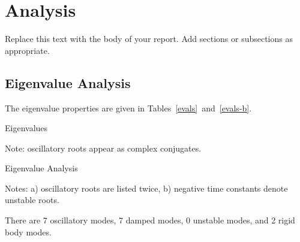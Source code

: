\chapter{Analysis}
Replace this text with the body of your report.  Add sections or subsections as appropriate.
\section{Eigenvalue Analysis}
The eigenvalue properties are given in Tables~\ref{evals}~and~\ref{evals-b}.

\begin{table}[ht]
\begin{center}
\begin{threeparttable}
\begin{footnotesize}
\caption{Eigenvalues}
\label{evals}
\begin{tablenotes}
\item Note: oscillatory roots appear as complex conjugates.
\end{tablenotes}
\end{footnotesize}
\end{threeparttable}
\end{center}
\end{table}
\begin{table}[ht]
\begin{center}
\begin{threeparttable}
\begin{footnotesize}
\caption{Eigenvalue Analysis}
\label{evals-b}
\begin{tablenotes}
\item Notes: a) oscillatory roots are listed twice, b) negative time constants denote unstable roots.
\end{tablenotes}
\end{footnotesize}
\end{threeparttable}
\end{center}
\end{table}
There are 7 oscillatory modes, 7 damped modes, 0 unstable modes, and 2 rigid body modes.
\pagebreak
